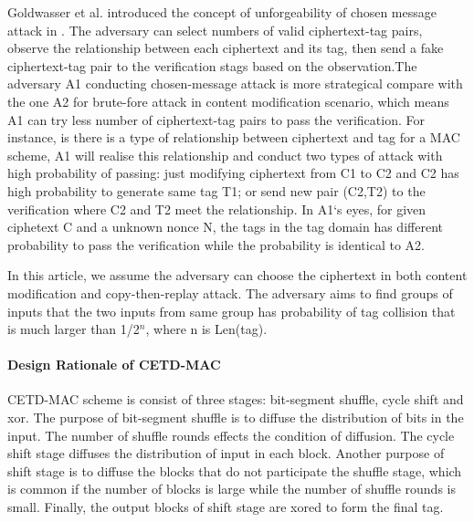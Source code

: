 \documentclass{article}
\begin{document}
Goldwasser et al. introduced the concept of unforgeability of chosen message attack in \cite{}. The adversary can select numbers of valid ciphertext-tag pairs, observe the relationship between each ciphertext and its tag, then send a fake ciphertext-tag pair to the verification stags based on the observation.The adversary A1 conducting chosen-message attack is more strategical compare with the one A2 for brute-fore attack in content modification scenario, which means A1 can try less number of ciphertext-tag pairs to pass the verification. 
For instance, is there is a type of relationship between ciphertext and tag for a MAC scheme, A1 will realise this relationship and conduct two types of attack with high probability of passing: just modifying ciphertext from C1 to C2 and C2 has high probability to generate same tag T1; or send new pair (C2,T2) to the verification where C2 and T2 meet the relationship. In A1`s eyes, for given ciphetext C and a unknown nonce N, the tags in the tag domain has different probability to pass the verification while the probability is identical to A2. 

In this article, we assume the adversary can choose the ciphertext in both content modification and copy-then-replay attack. The adversary aims to find groups of inputs that the two inputs from same group has probability of tag collision that is much larger than 1/2$^n$, where n is Len(tag). 

\paragraph{Design Rationale of CETD-MAC}
CETD-MAC scheme is consist of three stages: bit-segment shuffle, cycle shift and xor. The purpose of bit-segment shuffle is to diffuse the distribution of bits in the input. The number of shuffle rounds effects the condition of diffusion. 
The cycle shift stage diffuses the distribution of input in each block. Another purpose of shift stage is to diffuse the blocks that do not participate the shuffle stage, which is common if the number of blocks is large while the number of shuffle rounds is small. Finally, the output blocks of shift stage are xored to form the final tag. 
\end{document}
